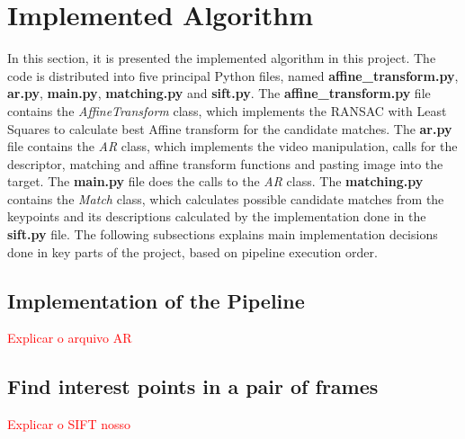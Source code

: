 \documentclass[]{IEEEtran}
\newcommand\todolist[1]{\textcolor{red}{#1}}
\begin{document}
\section{Implemented Algorithm}
In this section, it is presented the implemented algorithm in this project. The code is distributed into five principal Python files, named \textbf{affine\_transform.py}, \textbf{ar.py}, \textbf{main.py}, \textbf{matching.py} and \textbf{sift.py}. The \textbf{affine\_transform.py} file contains the \textit{AffineTransform} class, which implements the RANSAC with Least Squares to calculate best Affine transform for the candidate matches. The \textbf{ar.py} file contains the \textit{AR} class, which implements the video manipulation, calls for the descriptor, matching and affine transform functions and pasting image into the target. The \textbf{main.py} file does the calls to the \textit{AR} class. The \textbf{matching.py} contains the \textit{Match} class, which calculates possible candidate matches from the keypoints and its descriptions calculated by the implementation done in the \textbf{sift.py} file. The following subsections explains main implementation decisions done in key parts of the project, based on pipeline execution order.


\subsection{Implementation of the Pipeline}
\todolist{Explicar o arquivo AR}


\subsection{Find interest points in a pair of frames}
\todolist{Explicar o SIFT nosso}
 
\end{document}
